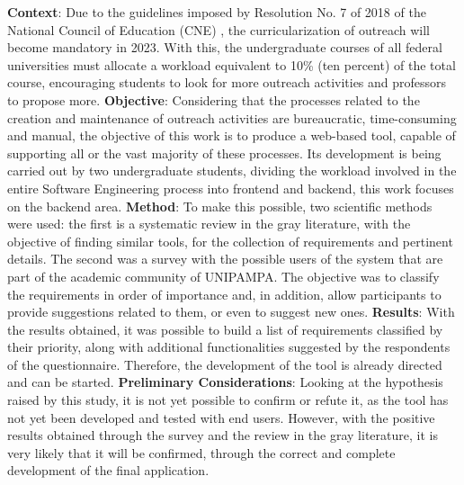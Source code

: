 \begin{resumo}[Abstract]

\textbf{Context}: Due to the guidelines imposed by Resolution No. 7 of 2018 of the National Council of Education (CNE) \cite{Resolucao-MEC:2018}, the curricularization of outreach will become mandatory in 2023. With this, the undergraduate courses of all federal universities must allocate a workload equivalent to 10\% (ten percent) of the total course, encouraging students to look for more outreach activities and professors to propose more.
\textbf{Objective}: Considering that the processes related to the creation and maintenance of outreach activities are bureaucratic, time-consuming and manual, the objective of this work is to produce a web-based tool, capable of supporting all or the vast majority of these processes. Its development is being carried out by two undergraduate students, dividing the workload involved in the entire Software Engineering process into frontend and backend, this work focuses on the backend area.
\textbf{Method}: To make this possible, two scientific methods were used:
the first is a systematic review in the gray literature, with the objective of finding similar tools, for the collection of requirements and pertinent details. The second was a survey with the possible users of the system that are part of the academic community of UNIPAMPA. The objective was to classify the requirements in order of importance and, in addition, allow participants to provide suggestions related to them, or even to suggest new ones.
\textbf{Results}: With the results obtained, it was possible to build a list of requirements classified by their priority, along with additional functionalities suggested by the respondents of the questionnaire. Therefore, the development of the tool is already directed and can be started.
\textbf{Preliminary Considerations}: Looking at the hypothesis raised by this study, it is not yet possible to confirm or refute it, as the tool has not yet been developed and tested with end users. However, with the positive results obtained through the survey and the review in the gray literature, it is very likely that it will be confirmed, through the correct and complete development of the final application.


\end{resumo}

